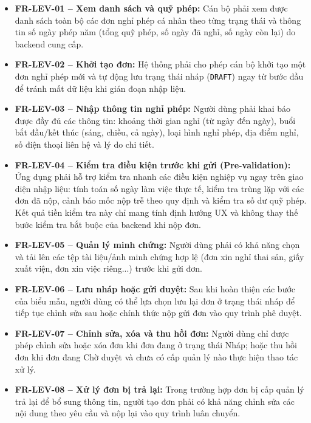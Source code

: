 \begin{itemize}[leftmargin=1.5cm]
    \item \textbf{FR-LEV-01 -- Xem danh sách và quỹ phép:} Cán bộ phải xem được danh sách toàn bộ các đơn nghỉ phép cá nhân theo từng trạng thái và thông tin số ngày phép năm (tổng quỹ phép, số ngày đã nghỉ, số ngày còn lại) do backend cung cấp.
    
    \item \textbf{FR-LEV-02 -- Khởi tạo đơn:} Hệ thống phải cho phép cán bộ khởi tạo một đơn nghỉ phép mới và tự động lưu trạng thái nháp (\texttt{DRAFT}) ngay từ bước đầu để tránh mất dữ liệu khi gián đoạn nhập liệu.
    
    \item \textbf{FR-LEV-03 -- Nhập thông tin nghỉ phép:} Người dùng phải khai báo được đầy đủ các thông tin: khoảng thời gian nghỉ (từ ngày đến ngày), buổi bắt đầu/kết thúc (sáng, chiều, cả ngày), loại hình nghỉ phép, địa điểm nghỉ, số điện thoại liên hệ và lý do chi tiết.
    
    \item \textbf{FR-LEV-04 -- Kiểm tra điều kiện trước khi gửi (Pre-validation):} Ứng dụng phải hỗ trợ kiểm tra nhanh các điều kiện nghiệp vụ ngay trên giao diện nhập liệu: tính toán số ngày làm việc thực tế, kiểm tra trùng lặp với các đơn đã nộp, cảnh báo mốc nộp trễ theo quy định và kiểm tra số dư quỹ phép. Kết quả tiền kiểm tra này chỉ mang tính định hướng UX và không thay thế bước kiểm tra bắt buộc của backend khi nộp đơn.
    
    \item \textbf{FR-LEV-05 -- Quản lý minh chứng:} Người dùng phải có khả năng chọn và tải lên các tệp tài liệu/ảnh minh chứng hợp lệ (đơn xin nghỉ thai sản, giấy xuất viện, đơn xin việc riêng...) trước khi gửi đơn.
    
    \item \textbf{FR-LEV-06 -- Lưu nháp hoặc gửi duyệt:} Sau khi hoàn thiện các bước của biểu mẫu, người dùng có thể lựa chọn lưu lại đơn ở trạng thái nháp để tiếp tục chỉnh sửa sau hoặc chính thức nộp gửi đơn vào quy trình phê duyệt.
    
    \item \textbf{FR-LEV-07 -- Chỉnh sửa, xóa và thu hồi đơn:} Người dùng chỉ được phép chỉnh sửa hoặc xóa đơn khi đơn đang ở trạng thái Nháp; hoặc thu hồi đơn khi đơn đang Chờ duyệt và chưa có cấp quản lý nào thực hiện thao tác xử lý.
    
    \item \textbf{FR-LEV-08 -- Xử lý đơn bị trả lại:} Trong trường hợp đơn bị cấp quản lý trả lại để bổ sung thông tin, người tạo đơn phải có khả năng chỉnh sửa các nội dung theo yêu cầu và nộp lại vào quy trình luân chuyển.
    

\end{itemize}
